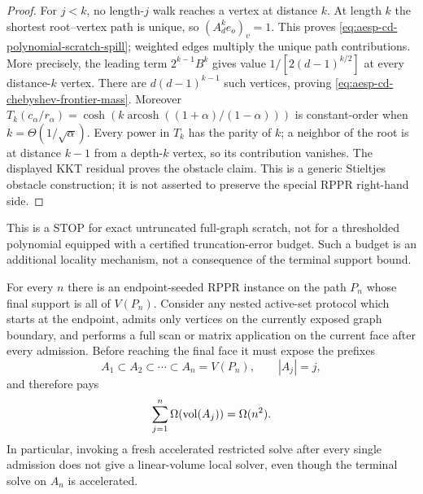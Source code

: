 \begin{proof}
For $j<k$, no length-$j$ walk reaches a vertex at distance $k$.  At length
$k$ the shortest root--vertex path is unique, so
$(A_d^ke_o)_v=1$.  This proves
\cref{eq:aesp-cd-polynomial-scratch-spill}; weighted edges multiply the
unique path contributions.  More precisely, the leading term
$2^{k-1}B^k$ gives value $1/[2(d-1)^{k/2}]$ at every distance-$k$ vertex.
There are $d(d-1)^{k-1}$ such vertices, proving
\cref{eq:aesp-cd-chebyshev-frontier-mass}.  Moreover
$T_k(c_\alpha/r_\alpha)
=\cosh(k\operatorname{arcosh}((1+\alpha)/(1-\alpha)))$ is constant-order
when $k=\Theta(1/\sqrt\alpha)$.  Every power in $T_k$ has the parity of $k$;
a neighbor of the root is at distance $k-1$ from a depth-$k$ vertex, so its
contribution vanishes.  The displayed KKT residual proves the obstacle claim.
This is a generic Stieltjes obstacle construction; it is not asserted to
preserve the special RPPR right-hand side.
\end{proof}

This is a STOP for exact untruncated full-graph scratch, not for a thresholded
polynomial equipped with a certified truncation-error budget.  Such a budget
is an additional locality mechanism, not a consequence of the terminal
support bound.

\begin{proposition}
\label{prop:aesp-cd-face-by-face-volume-stop}
For every $n$ there is an endpoint-seeded RPPR instance on the path $P_n$
whose final support is all of $V(P_n)$.  Consider any nested active-set
protocol which starts at the endpoint, admits only vertices on the currently
exposed graph boundary, and performs a full scan or matrix application on
the current face after every admission.  Before reaching the final face it
must expose the prefixes
\begin{equation*}
 A_1\subset A_2\subset\cdots\subset A_n=V(P_n),
 \qquad |A_j|=j,
\end{equation*}
and therefore pays
\begin{equation}
 \sum_{j=1}^n\Omega(\operatorname{vol}(A_j))=\Omega(n^2).
 \label{eq:aesp-cd-face-by-face-volume-stop}
\end{equation}
In particular, invoking a fresh accelerated restricted solve after every
single admission does not give a linear-volume local solver, even though the
terminal solve on $A_n$ is accelerated.
\end{proposition}

